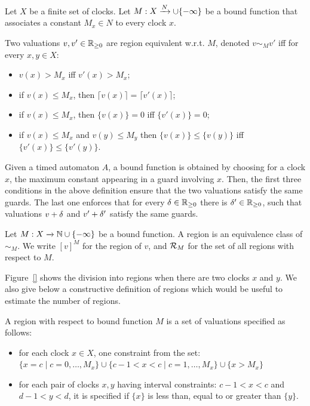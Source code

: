 Let $X$ be a finite set of clocks. Let $M : X \xrightarrow{N} \cup \{-\infty\}$ be a bound function that associates a constant $M_x \in N$ to every clock $x$.

\begin{definition}
Two valuations $v, v' \in \mathbb{R}_{\ge 0}$ are region equivalent w.r.t. $M$, denoted $v \sim_M v'$ iﬀ for every $x, y \in X$:
\begin{itemize}
	\item $v(x) > M_x$ iﬀ $v'(x) > M_x$;
	\item if $v(x) \leq M_x$, then $\lceil v(x) \rceil = \lceil v'(x) \rceil$;
	\item if $v(x) \leq M_x$, then $\{v(x)\} = 0$ iﬀ $\{v'(x)\} = 0$;
	\item if $v(x) \leq M_x$ and $v(y) \leq M_y$ then $\{v(x)\} \leq \{v(y)\}$ iﬀ $\{v'(x)\} \leq \{v'(y)\}$.
\end{itemize}
\end{definition}

Given a timed automaton $A$, a bound function is obtained by choosing for a clock $x$, the maximum constant appearing in a guard involving $x$. Then, the first three conditions in the above definition ensure that the two valuations satisfy the same guards. The last one enforces that for every $\delta \in \mathbb{R}_{\ge 0}$ there is $\delta' \in \mathbb{R}_{\ge 0}$, such that valuations $v + \delta$ and $v' + \delta'$ satisfy the same guards.

\begin{definition}
Let $M : X \xrightarrow{} \mathbb{N} \cup \{-\infty\}$ be a bound function. A region is an equivalence class of $\sim_M$. We write $[v]^M$ for the region of $v$, and ${\mathcal R}_M$ for the set of all regions with respect to $M$.
\end{definition}

Figure~\ref{} shows the division into regions when there are two clocks $x$ and $y$. We also give below a constructive definition of regions which would be useful to estimate the number of regions.

\begin{definition}
A region with respect to bound function $M$ is a set of valuations specified as follows:
\begin{itemize}
	\item for each clock $x \in X$, one constraint from the set: $\{x = c \mid c = 0, \dots, M_x\} \cup \{c - 1 < x < c \mid c = 1, \dots, M_x\} \cup \{x > M_x\}$
	\item for each pair of clocks $x, y$ having interval constraints: $c - 1 < x < c$ and $d - 1 < y < d$, it is specified if $\{x\}$ is less than, equal to or greater than $\{y\}$.
\end{itemize}
\end{definition}

